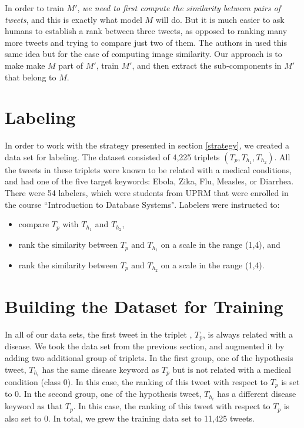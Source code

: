 \documentclass[12pt]{report}
\begin{document}
In order to train $M'$, {\em we need to first compute the similarity between pairs of tweets}, and this is exactly what model $M$ will do. But it is much easier to ask humans to establish a rank between three tweets, as opposed to ranking many more tweets and trying to compare just two of them. The authors in \cite{Wang2014} used this same idea but for 
the case of computing image similarity. Our approach is to make make $M$ part of $M'$, 
train $M'$, and then extract the sub-components in $M'$ that belong to $M$. 

\section{Labeling}
In order to work with the strategy presented in section \ref{strategy}, we created a data set for labeling. 
The dataset consisted of  4,225 triplets $(T_p, T_{h_1}, T_{h_2})$. All the tweets in these triplets were known to 
be related with a medical conditions, and had one of the five target keywords: Ebola, Zika, Flu, Measles, or Diarrhea.
There were 54 labelers, which were students from UPRM
that were enrolled in the course ``Introduction to Database Systems". Labelers were instructed to:
\begin{itemize}[nolistsep]
	\item compare $T_p$ with   $T_{h_1}$ and  $T_{h_2}$,
	\item rank the similarity between $T_p$  and   $T_{h_1}$ on a scale in the range (1,4), and
	\item rank the similarity between $T_p$  and   $T_{h_2}$ on a scale in the range (1,4).
\end{itemize}

\section{Building the Dataset for Training \label{buildtrain}}
In all of our data sets, the first tweet in the triplet , $T_p$, is always related with a disease. 
We took the data set from the previous section, and augmented it by adding two additional group of triplets.  In the first group, one of the 
hypothesis tweet, $T_{h_i}$ has the same disease keyword as $T_p$ but is not related with a medical condition (class 0). In this case, the 
ranking of this tweet with respect to $T_p$ is set to 0. In the second group, one of the hypothesis tweet, $T_{h_i}$ has a different disease keyword as that $T_p$.  In this case, the ranking of this tweet with respect to $T_p$ is also set to 0. In total, we grew the training data set to 11,425 tweets. 
\end{document}
